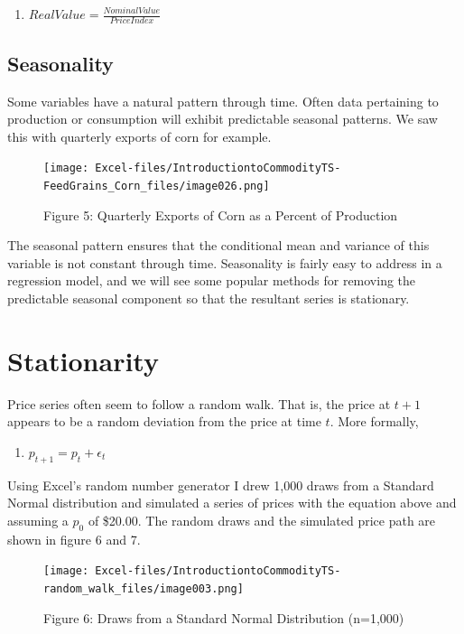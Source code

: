 \documentclass[
]{book}
\providecommand{\tightlist}{%
  \setlength{\itemsep}{0pt}\setlength{\parskip}{0pt}}
\begin{document}
\begin{enumerate}
\def\labelenumi{(\arabic{enumi})}
\setcounter{enumi}{1}
\tightlist
\item
  \(Real Value = \frac{Nominal Value}{Price Index}\)
\end{enumerate}

\hypertarget{seasonality}{%
\subsection{Seasonality}\label{seasonality}}

Some variables have a natural pattern through time. Often data pertaining to production or consumption will exhibit predictable seasonal patterns. We saw this with quarterly exports of corn for example.

\begin{figure}
\centering
\texttt{[image: Excel-files/IntroductiontoCommodityTS-FeedGrains\_Corn\_files/image026.png]}
\caption{Figure 5: Quarterly Exports of Corn as a Percent of Production}
\end{figure}

The seasonal pattern ensures that the conditional mean and variance of this variable is not constant through time. Seasonality is fairly easy to address in a regression model, and we will see some popular methods for removing the predictable seasonal component so that the resultant series is stationary.

\hypertarget{stationarity}{%
\section{Stationarity}\label{stationarity}}

Price series often seem to follow a random walk. That is, the price at \(t+1\) appears to be a random deviation from the price at time \(t\). More formally,

\begin{enumerate}
\def\labelenumi{(\arabic{enumi})}
\setcounter{enumi}{2}
\tightlist
\item
  \(p_{t+1} = p_{t} + \epsilon_t\)
\end{enumerate}

Using Excel's random number generator I drew 1,000 draws from a Standard Normal distribution and simulated a series of prices with the equation above and assuming a \(p_0\) of \$20.00. The random draws and the simulated price path are shown in figure 6 and 7.

\begin{figure}
\centering
\texttt{[image: Excel-files/IntroductiontoCommodityTS-random\_walk\_files/image003.png]}
\caption{Figure 6: Draws from a Standard Normal Distribution (n=1,000)}
\end{figure}
\end{document}
